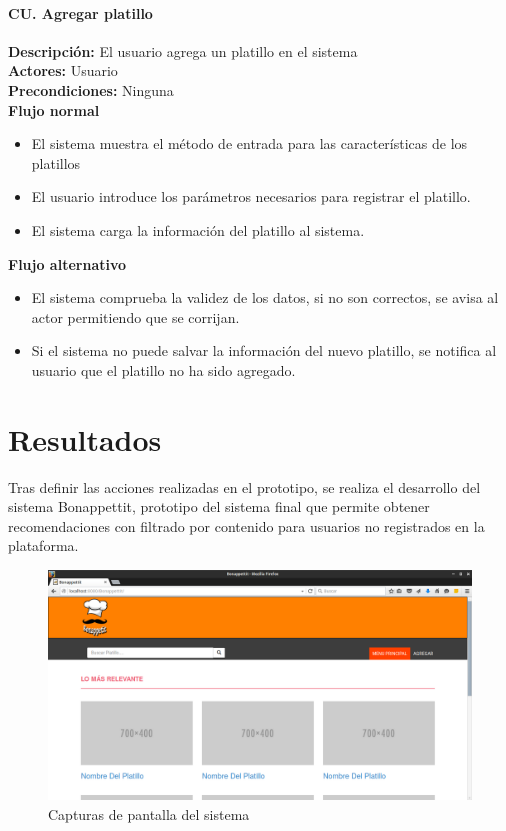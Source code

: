     \paragraph{CU. Agregar platillo\\}
    \textbf{Descripción:} El usuario agrega un platillo en el sistema\\
    \textbf{Actores:} Usuario\\
    \textbf{Precondiciones:} Ninguna\\
    \textbf{Flujo normal}\\
    \begin{itemize}
      \item El sistema muestra el método de entrada para las características de los platillos
      \item El usuario introduce los parámetros necesarios para registrar el platillo.
      \item El sistema carga la información del platillo al sistema.
    \end{itemize}
    \textbf{Flujo alternativo}\\
    \begin{itemize}
      \item El sistema comprueba la validez de los datos, si no son correctos, se avisa al actor permitiendo que se corrijan. 
      \item Si el sistema no puede salvar la información del nuevo platillo, se notifica al usuario que el platillo no ha sido agregado.
    \end{itemize}
    
  \section{Resultados}
    Tras definir las acciones realizadas en el prototipo, se realiza el desarrollo del sistema Bonappettit, prototipo del sistema final que permite obtener recomendaciones con filtrado por contenido para usuarios no registrados en la plataforma.
          \begin{figure}[h!]
          \centering
          \includegraphics[width=16cm]{./images/bonappettit.png}
          \caption{Capturas de pantalla del sistema}
        \end{figure}

